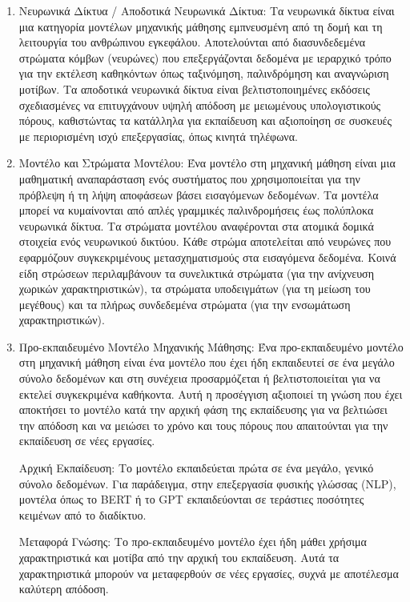 \begin{enumerate}
    \item Νευρωνικά Δίκτυα / Αποδοτικά Νευρωνικά Δίκτυα: Τα νευρωνικά δίκτυα είναι μια κατηγορία μοντέλων μηχανικής μάθησης εμπνευσμένη από τη δομή και τη λειτουργία του ανθρώπινου εγκεφάλου. Αποτελούνται από διασυνδεδεμένα στρώματα κόμβων (νευρώνες) που επεξεργάζονται δεδομένα με ιεραρχικό τρόπο για την εκτέλεση καθηκόντων όπως ταξινόμηση, παλινδρόμηση και αναγνώριση μοτίβων. Τα αποδοτικά νευρωνικά δίκτυα είναι βελτιστοποιημένες εκδόσεις σχεδιασμένες να επιτυγχάνουν υψηλή απόδοση με μειωμένους υπολογιστικούς πόρους, καθιστώντας τα κατάλληλα για εκπαίδευση και αξιοποίηση σε συσκευές με περιορισμένη ισχύ επεξεργασίας, όπως κινητά τηλέφωνα.

    \item Μοντέλο και Στρώματα Μοντέλου: Ένα μοντέλο στη μηχανική μάθηση είναι μια μαθηματική αναπαράσταση ενός συστήματος που χρησιμοποιείται για την πρόβλεψη ή τη λήψη αποφάσεων βάσει εισαγόμενων δεδομένων. Τα μοντέλα μπορεί να κυμαίνονται από απλές γραμμικές παλινδρομήσεις έως πολύπλοκα νευρωνικά δίκτυα. Τα στρώματα μοντέλου αναφέρονται στα ατομικά δομικά στοιχεία ενός νευρωνικού δικτύου. Κάθε στρώμα αποτελείται από νευρώνες που εφαρμόζουν συγκεκριμένους μετασχηματισμούς στα εισαγόμενα δεδομένα. Κοινά είδη στρώσεων περιλαμβάνουν τα συνελικτικά στρώματα (για την ανίχνευση χωρικών χαρακτηριστικών), τα στρώματα υποδειγμάτων (για τη μείωση του μεγέθους) και τα πλήρως συνδεδεμένα στρώματα (για την ενσωμάτωση χαρακτηριστικών).    

    \item Προ-εκπαιδευμένο Μοντέλο Μηχανικής Μάθησης: Ένα προ-εκπαιδευμένο μοντέλο στη μηχανική μάθηση είναι ένα μοντέλο που έχει ήδη εκπαιδευτεί σε ένα μεγάλο σύνολο δεδομένων και στη συνέχεια προσαρμόζεται ή βελτιστοποιείται για να εκτελεί συγκεκριμένα καθήκοντα. Αυτή η προσέγγιση αξιοποιεί τη γνώση που έχει αποκτήσει το μοντέλο κατά την αρχική φάση της εκπαίδευσης για να βελτιώσει την απόδοση και να μειώσει το χρόνο και τους πόρους που απαιτούνται για την εκπαίδευση σε νέες εργασίες.

    Αρχική Εκπαίδευση: Το μοντέλο εκπαιδεύεται πρώτα σε ένα μεγάλο, γενικό σύνολο δεδομένων. Για παράδειγμα, στην επεξεργασία φυσικής γλώσσας (NLP), μοντέλα όπως το BERT ή το GPT εκπαιδεύονται σε τεράστιες ποσότητες κειμένων από το διαδίκτυο.
    
    Μεταφορά Γνώσης: Το προ-εκπαιδευμένο μοντέλο έχει ήδη μάθει χρήσιμα χαρακτηριστικά και μοτίβα από την αρχική του εκπαίδευση. Αυτά τα χαρακτηριστικά μπορούν να μεταφερθούν σε νέες εργασίες, συχνά με αποτέλεσμα καλύτερη απόδοση.
    

\end{enumerate}
